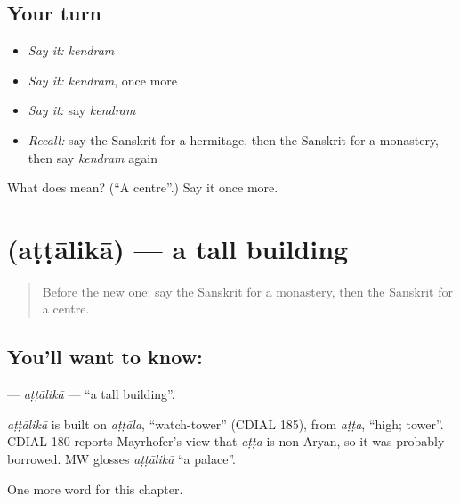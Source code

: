 \subsection*{Your turn}
\begin{itemize}
\raggedright
  \item \emph{Say it:} \emph{kendram}
  \item \emph{Say it:} \emph{kendram}, once more
  \item \emph{Say it:} say \emph{kendram}
  \item \emph{Recall:} say the Sanskrit for a hermitage, then the Sanskrit for a monastery, then say \emph{kendram} again
\end{itemize}

\begin{tcolorbox}[breakable,colback=teal!4,colframe=teal!35!black,title={Before you move on}]
What does  mean? (\textquotedblleft{}A centre\textquotedblright{}.) Say it once more.
\end{tcolorbox}
\section[\texorpdfstring{\sk{अट्टालिका} (aṭṭālikā)}{अट्टालिका (aṭṭālikā)}]{ (aṭṭālikā) — a tall building}

\label{lesson:SA-C224-attalika}



\begin{quote}
Before the new one: say the Sanskrit for a monastery, then the Sanskrit for a centre.
\end{quote}

\subsection*{You'll want to know: }
\textbf{} — \emph{aṭṭālikā} — \textquotedblleft{}a tall building\textquotedblright{}.

\begin{cousinweb}
\emph{aṭṭālikā} is built on \emph{aṭṭāla}, \textquotedblleft{}watch-tower\textquotedblright{} (CDIAL 185), from \emph{aṭṭa}, \textquotedblleft{}high; tower\textquotedblright{}. CDIAL 180 reports Mayrhofer's view that \emph{aṭṭa} is non-Aryan, so it was probably borrowed. MW glosses \emph{aṭṭālikā} \textquotedblleft{}a palace\textquotedblright{}.
\end{cousinweb}

\begin{grammarlens}[title={What you've built}]
One more word for this chapter.
\end{grammarlens}

